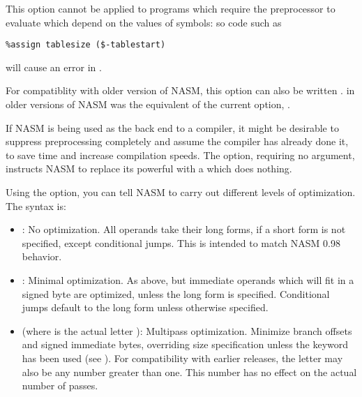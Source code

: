 This option cannot be applied to programs which require the
preprocessor to evaluate 
 which depend on the values of symbols:
so code such as

\begin{lstlisting}
%assign tablesize ($-tablestart)
\end{lstlisting}

will cause an error in .

For compatiblity with older version of NASM, this option can also be
written .  in older versions of NASM was the equivalent
of the current  option, .


If NASM is being used as the back end to a compiler, it might be
desirable to suppress preprocessing
completely and assume the compiler has already done it, to save time
and increase compilation speeds. The  option, requiring no
argument, instructs NASM to replace its powerful 
with a  which does nothing.


Using the  option, you can tell NASM to carry out different
levels of optimization. The syntax is:

\begin{itemize}
    \item{: No optimization. All operands take their
        long forms, if a short form is not specified, except conditional
        jumps. This is intended to match NASM 0.98 behavior.}

    \item{: Minimal optimization. As above, but immediate
        operands which will fit in a signed byte are optimized,
        unless the long form is specified. Conditional jumps default
        to the long form unless otherwise specified.}

    \item{ (where  is the actual letter ):
        Multipass optimization. Minimize branch offsets and signed immediate
        bytes, overriding size specification unless the  keyword
        has been used (see ). For compatibility with earlier
        releases, the letter  may also be any number greater than
        one. This number has no effect on the actual number of passes.}
\end{itemize}

